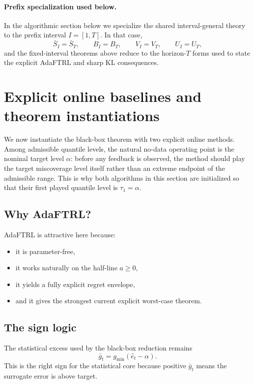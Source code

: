 \documentclass[11pt]{article}
\newcommand{\1}{\mathbf{1}}
\begin{document}
\paragraph{Prefix specialization used below.}
In the algorithmic section below we specialize the shared interval-general theory to the prefix interval $I=[1,T]$. In that case,
\[
\bar S_I=\bar S_T,
\qquad
B_I=B_T,
\qquad
V_I=V_T,
\qquad
U_I=U_T,
\]
and the fixed-interval theorems above reduce to the horizon-$T$ forms used to state the explicit AdaFTRL and sharp KL consequences.

\section{Explicit online baselines and theorem instantiations}
\label{sec:adaftrl}

We now instantiate the black-box theorem with two explicit online methods. Among admissible quantile levels, the natural no-data operating point is the nominal target level $\alpha$: before any feedback is observed, the method should play the target miscoverage level itself rather than an extreme endpoint of the admissible range. This is why both algorithms in this section are initialized so that their first played quantile level is $\tau_1=\alpha$.

\subsection{Why AdaFTRL?}

AdaFTRL is attractive here because:
\begin{itemize}[leftmargin=*,itemsep=2pt]
  \item it is parameter-free,
  \item it works naturally on the half-line \(a\ge 0\),
  \item it yields a fully explicit regret envelope,
  \item and it gives the strongest current explicit worst-case theorem.
\end{itemize}

\subsection{The sign logic}

The statistical excess used by the black-box reduction remains
\[
\bar g_t=g_{\min}(\hat e_t-\alpha).
\]
This is the right sign for the statistical core because positive \(\bar g_t\) means the surrogate error is above target.
\end{document}
